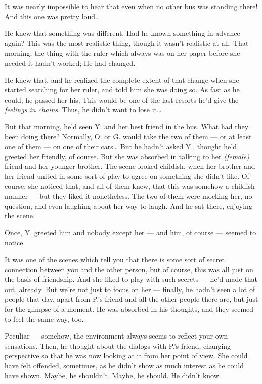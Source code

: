 It was nearly impossible to hear that even when no other bus was standing there! And this one was pretty loud\dots{}

He knew that something was different. Had he known something in advance again? This was the most realistic thing, though it wasn't realistic at all. 
That morning, the thing with the ruler which always was on her paper before she needed it hadn't worked; He had changed.

He knew that, and he realized the complete extent of that change when she started searching for her ruler, and told him she was doing so. As fast as he could, he passed her his; This would be one of the last resorts he'd give the \emph{feelings in chains}. Thus, he didn't want to lose it\dots{}

But that morning, he'd seen Y. and her best friend in the bus. What had they been doing there? Normally, O. or G. would take the two of them --- or at least one of them --- on one of their cars\dots{}
But he hadn't asked Y., thought he'd greeted her friendly, of course. But she was absorbed in talking to her \emph{(female)} friend and her younger brother. The scene looked childish, when her brother and her friend united in some sort of play to agree on something she didn't like. Of course, she noticed that, and all of them knew, that this was somehow a childish manner --- but they liked it nonetheless. 
The two of them were mocking her, no question, and even laughing about her way to laugh. 
And he sat there, enjoying the scene. 

Once, Y. greeted him and nobody except her --- and him, of course --- seemed to notice. 

It was one of the scenes which tell you that there is some sort of secret connection between you and the other person, but of course, this was all just on the basis of friendship. And she liked to play with such secrets --- he'd made that out, already. 
But we're not just to focus on her --- finally, he hadn't seen a lot of people that day, apart from P.'s friend and all the other people there are, but just for the glimpse of a moment. 
He was absorbed in his thoughts, and they seemed to feel the same way, too. 

Peculiar --- somehow, the environment always seems to reflect your own sensations. 
Then, he thought about the dialogs with P.'s friend, changing perspective so that he was now looking at it from her point of view. 
She could have felt offended, sometimes, as he didn't show as much interest as he could have shown. Maybe, he shouldn't. Maybe, he should. 
He didn't know.

